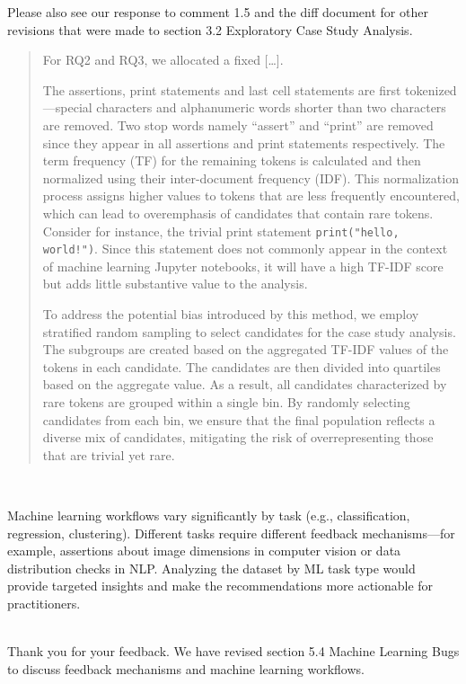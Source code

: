 \documentclass[11pt,fleqn]{article}
\newcommand{\eline}{\vspace*{.75\baselineskip}}
\newcommand{\Referee}[1]{\eline \noindent {\bf Reviewer comment #1:} \\}
\newcommand{\Us}{\eline \noindent {\bf Response:}\\}
\newenvironment{revcomment}[1][]
{\Referee{#1}\begin{rcomment}}
{\end{rcomment}}
\begin{document}
Please also see our response to comment 1.5 and the diff document for other revisions that were made to section 3.2 Exploratory Case Study Analysis.

\begin{quote}
  For RQ2 and RQ3, we allocated a fixed [\ldots].

  The assertions, print statements and last cell statements are first tokenized---special characters and alphanumeric words shorter than two characters are removed. Two stop words namely ``assert'' and ``print'' are removed since they appear in all assertions and print statements respectively. The term frequency (TF) for the remaining tokens is calculated and then normalized using their inter-document frequency (IDF). This normalization process assigns higher values to tokens that are less frequently encountered, which can lead to overemphasis of candidates that contain rare tokens. Consider for instance, the trivial print statement \texttt{print("hello, world!")}. Since this statement does not commonly appear in the context of machine learning Jupyter notebooks, it will have a high TF-IDF score but adds little substantive value to the analysis.

  To address the potential bias introduced by this method, we employ stratified random sampling to select candidates for the case study analysis. The subgroups are created based on the aggregated TF-IDF values of the tokens in each candidate. The candidates are then divided into quartiles based on the aggregate value. As a result, all candidates characterized by rare tokens are grouped within a single bin. By randomly selecting candidates from each bin, we ensure that the final population reflects a diverse mix of candidates, mitigating the risk of overrepresenting those that are trivial yet rare.
\end{quote}

\begin{revcomment}[2.6]
  Machine learning workflows vary significantly by task (e.g., classification, regression, clustering). Different tasks require different feedback mechanisms—for example, assertions about image dimensions in computer vision or data distribution checks in NLP. Analyzing the dataset by ML task type would provide targeted insights and make the recommendations more actionable for practitioners.
\end{revcomment}

\Us Thank you for your feedback. We have revised section 5.4 Machine Learning Bugs to discuss feedback mechanisms and machine learning workflows.
\end{document}
